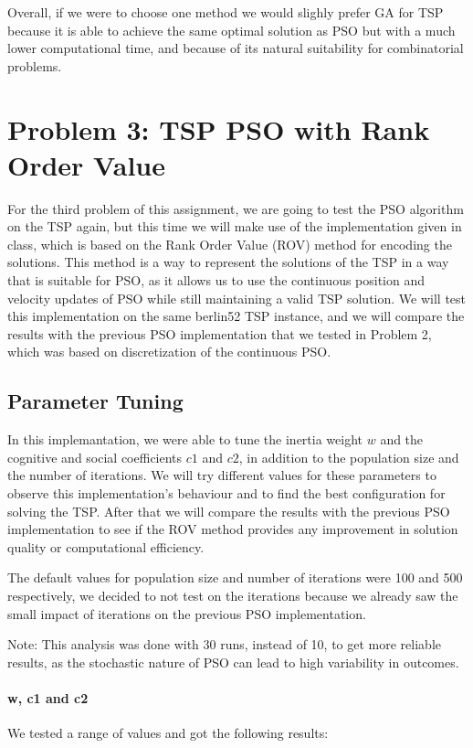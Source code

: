 \documentclass[12pt,a4paper]{article}
\begin{document}
 Overall, if we were to choose one method we would slighly prefer GA for TSP because it is able to achieve the same optimal solution as PSO but with a much lower computational time, and because of its natural suitability for combinatorial problems.
\section{Problem 3: TSP PSO with Rank Order Value}
For the third problem of this assignment, we are going to test the PSO algorithm on the TSP again, but this time we will make use of the implementation
given in class, which is based on the Rank Order Value (ROV) method for encoding the solutions.
This method is a way to represent the solutions of the TSP in a way that is suitable for PSO, as it allows us to use the continuous position and velocity updates of PSO while still maintaining a valid TSP solution.
We will test this implementation on the same berlin52 TSP instance, and we will compare the results with the previous PSO implementation that we tested in Problem 2, which was based on discretization of the continuous PSO.
\subsection{Parameter Tuning}
In this implemantation, we were able to tune the inertia weight $w$ and the cognitive and social coefficients $c1$ and $c2$, in addition to the population size and the number of iterations.
We will try different values for these parameters to observe this implementation's behaviour and to find the best configuration for solving the TSP.
After that we will compare the results with the previous PSO implementation to see if the ROV method provides any improvement in solution quality or computational efficiency.

The default values for population size and number of iterations were 100 and 500 respectively, we decided to not test on the iterations because we already saw the small impact of iterations on the previous PSO implementation.

Note: This analysis was done with 30 runs, instead of 10, to get more reliable results, as the stochastic nature of PSO can lead to high variability in outcomes.
\paragraph{w, c1 and c2}


We tested a range of values and got the following results:
\end{document}
